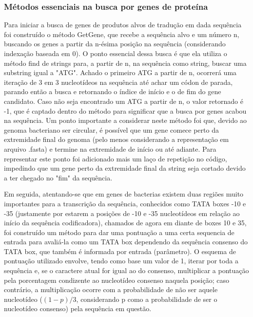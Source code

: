 \documentclass[brazilian,12pt,a4paper,final]{article}
\begin{document}
		\subsubsection{Métodos essenciais na busca por genes de proteína}
	Para iniciar a busca de genes de produtos alvos de tradução em dada sequência foi construído o método GetGene, que recebe a sequência alvo e um número n, buscando os genes a partir da
	n-ésima posição na sequência (considerando indexação baseada em 0). O ponto essencial dessa busca é que ela utiliza o método find de strings para, a partir de n,
	na sequência como string, buscar uma substring igual a "ATG". Achado o primeiro ATG a partir de n, ocorrerá uma iteração de 3 em 3 nucleotídeos na sequência até achar um 
	códon de parada, parando então a busca e retornando o índice de início e o de fim do gene candidato. Caso não seja encontrado um ATG a partir de n, o valor retornado
	é -1, que é captado dentro do método para significar que a busca por genes  acabou na sequência. Um ponto importante a considerar neste método foi que, devido
	ao genoma bacteriano ser circular, é possível que um gene comece perto da extremidade final do genoma (pelo menos considerando a representação em arquivo .fasta) e termine
	na extremidade de início ou até adiante. Para representar este ponto foi adicionado mais um laço de repetição no código, impedindo que um gene perto da extremidade final da string seja cortado devido a ter chegado no "fim" da sequência.
	
	\vspace{0.5cm}
	
	Em seguida, atentando-se que em genes de bacterias existem duas regiões muito importantes para a transcrição da sequência, conhecidos como TATA boxes -10 e -35 (justamente por estarem a posições de -10 e -35 nucleotídeos em relação ao início da sequência codificadora), chamados de agora em diante de boxes 10 e 35, foi construído um método para dar uma pontuação a uma certa sequencia de entrada
	para avaliá-la como um TATA box dependendo da sequência consenso do TATA box, que também é informada por entrada (parâmetro). O esquema de pontuação utilizado envolve, tendo como base um valor de 1, iterar por toda a sequência e, se o caractere atual for igual ao do consenso, multiplicar a pontuação pela porcentagem condizente ao nucleotídeo consenso naquela posição; caso contrário, a multiplicação ocorre com a probabilidade de não ser aquele nucleotídeo (\((1-p)/3\), considerando p como a probabilidade de ser o nucleotídeo consenso)	pela sequência em questão.
	
\end{document}
